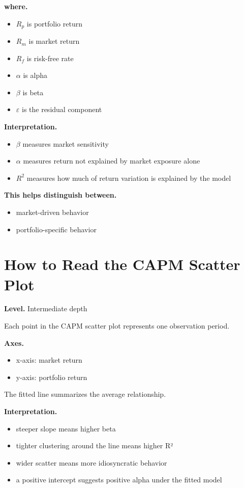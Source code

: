 \documentclass[11pt]{report}
\begin{document}
\textbf{where.}

\begin{itemize}
\item $R_p$ is portfolio return
\item $R_m$ is market return
\item $R_f$ is risk-free rate
\item $\alpha$ is alpha
\item $\beta$ is beta
\item $\varepsilon$ is the residual component
\end{itemize}

\textbf{Interpretation.}

\begin{itemize}
\item $\beta$ measures market sensitivity
\item $\alpha$ measures return not explained by market exposure alone
\item $R^2$ measures how much of return variation is explained by the model
\end{itemize}

\textbf{This helps distinguish between.}

\begin{itemize}
\item market-driven behavior
\item portfolio-specific behavior
\end{itemize}

\section{How to Read the CAPM Scatter Plot}
\begin{callout}
\textbf{Level.} Intermediate depth
\end{callout}

Each point in the CAPM scatter plot represents one observation period.

\textbf{Axes.}

\begin{itemize}
\item x-axis: market return
\item y-axis: portfolio return
\end{itemize}

The fitted line summarizes the average relationship.

\textbf{Interpretation.}

\begin{itemize}
\item steeper slope means higher beta
\item tighter clustering around the line means higher R²
\item wider scatter means more idiosyncratic behavior
\item a positive intercept suggests positive alpha under the fitted model
\end{itemize}
\end{document}

